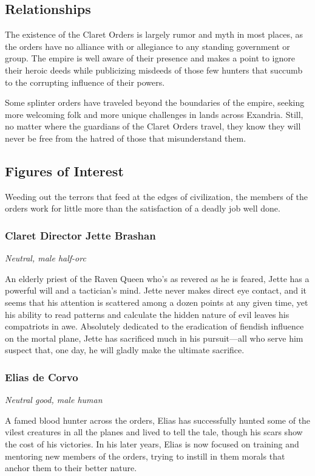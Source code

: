 \documentclass[10pt,a4paper,twoside,bg=print,twocolumn,openany,nodeprecatedcode]{dndbook}
\begin{document}
\subsection{Relationships}
The existence of the Claret Orders is largely rumor and myth in most places, as the orders have no alliance with or allegiance to any standing government or group. The empire is well aware of their presence and makes a point to ignore their heroic deeds while publicizing misdeeds of those few hunters that succumb to the corrupting influence of their powers.

Some splinter orders have traveled beyond the boundaries of the empire, seeking more welcoming folk and more unique challenges in lands across Exandria. Still, no matter where the guardians of the Claret Orders travel, they know they will never be free from the hatred of those that misunderstand them.

\subsection{Figures of Interest}
Weeding out the terrors that feed at the edges of civilization, the members of the orders work for little more than the satisfaction of a deadly job well done.

\subsubsection{Claret Director Jette Brashan}
\textit{Neutral, male half-orc}

An elderly priest of the Raven Queen who's as revered as he is feared, Jette has a powerful will and a tactician's mind. Jette never makes direct eye contact, and it seems that his attention is scattered among a dozen points at any given time, yet his ability to read patterns and calculate the hidden nature of evil leaves his compatriots in awe. Absolutely dedicated to the eradication of fiendish influence on the mortal plane, Jette has sacrificed much in his pursuit—all who serve him suspect that, one day, he will gladly make the ultimate sacrifice.

\subsubsection{Elias de Corvo}
\textit{Neutral good, male human}

A famed blood hunter across the orders, Elias has successfully hunted some of the vilest creatures in all the planes and lived to tell the tale, though his scars show the cost of his victories. In his later years, Elias is now focused on training and mentoring new members of the orders, trying to instill in them morals that anchor them to their better nature.
\end{document}

